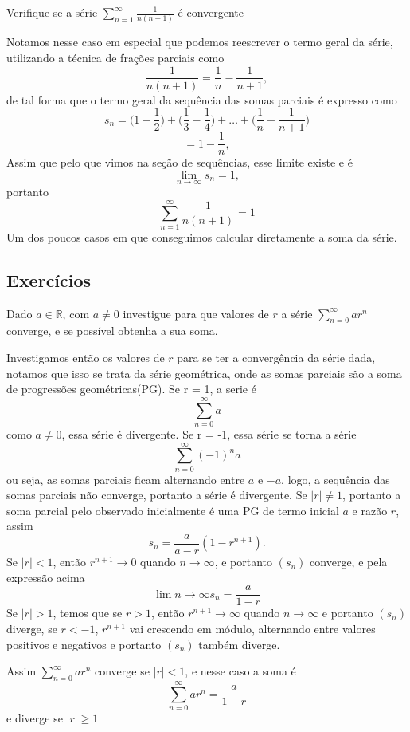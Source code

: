 \begin{exeresol}
    Verifique se a série $\sum_{n = 1}^{\infty} \frac{1}{n(n+1)}$ é convergente 
\end{exeresol}

\begin{resol}
    Notamos nesse caso em especial que podemos reescrever o termo geral da série,
    utilizando a técnica de frações parciais como
    $$\frac{1}{n(n+1)} = \frac{1}{n} - \frac{1}{n+1},$$
    de tal forma que o termo geral da sequência das somas parciais é expresso como
    $$s_n = \bigg(1 - \frac{1}{2}\bigg)+\bigg(\frac{1}{3}-\frac{1}{4}\bigg)+\dots+\bigg(\frac{1}{n}-\frac{1}{n+1}\bigg)$$
    $$ = 1 - \frac{1}{n},$$
    Assim que pelo que vimos na seção de sequências, esse limite existe e é
    $$\lim_{n \to \infty} s_n = 1,$$
    portanto
    $$\sum_{n = 1}^{\infty} \frac{1}{n(n+1)} = 1$$
    Um dos poucos casos em que conseguimos calcular diretamente a soma da série.
\end{resol}

\subsection*{Exercícios}

\construirExer

\begin{exer}
    Dado $a \in \mathbb{R}$, com $a \neq 0$ investigue para que valores de $r$ a
    série $\sum_{n = 0}^{\infty} ar^n$ converge, e se possível obtenha a sua soma.
\end{exer}

\begin{resp}
    Investigamos então os valores de $r$ para se ter a convergência da série dada,
    notamos que isso se trata da série geométrica, onde as somas parciais são a
    soma de progressões geométricas(PG). Se r = 1, a serie é 
    $$ \sum_{n = 0}^{\infty} a$$
    como $a \neq 0$, essa série é divergente.
    Se r = -1, essa série se torna a série
    $$ \sum_{n = 0}^{\infty} (-1)^n a$$
    ou seja, as somas parciais ficam alternando entre $a$ e $-a$, logo, 
    a sequência das somas parciais não converge, portanto a série é divergente.
    Se $|r| \neq 1$, portanto a soma parcial pelo observado inicialmente é uma
    PG de termo inicial $a$ e razão $r$, assim
    $$s_n = \frac{a}{a-r}(1-r^{n+1}).$$
    Se $|r| < 1$, então $r^{n+1} \to 0$ quando $n \to \infty$, e portanto $(s_n)$
    converge, e pela expressão acima
    $$ \lim{n \to \infty} s_n = \frac{a}{1-r}$$
    Se $|r|> 1$, temos que se $r>1$, então $r^{n+1} \to \infty$ quando
    $n \to \infty$ e portanto $(s_n)$ diverge, se $r<-1$, $r^{n+1}$ vai crescendo 
    em módulo, alternando entre valores positivos e negativos e portanto $(s_n)$
    também diverge.

    Assim $\sum_{n = 0}^{\infty} ar^n$ converge se $|r| <1$, e nesse caso a soma é 
    $$\sum_{n = 0}^{\infty} ar^n = \frac{a}{1-r}$$
    e diverge se $|r| \geq 1$
\end{resp}

